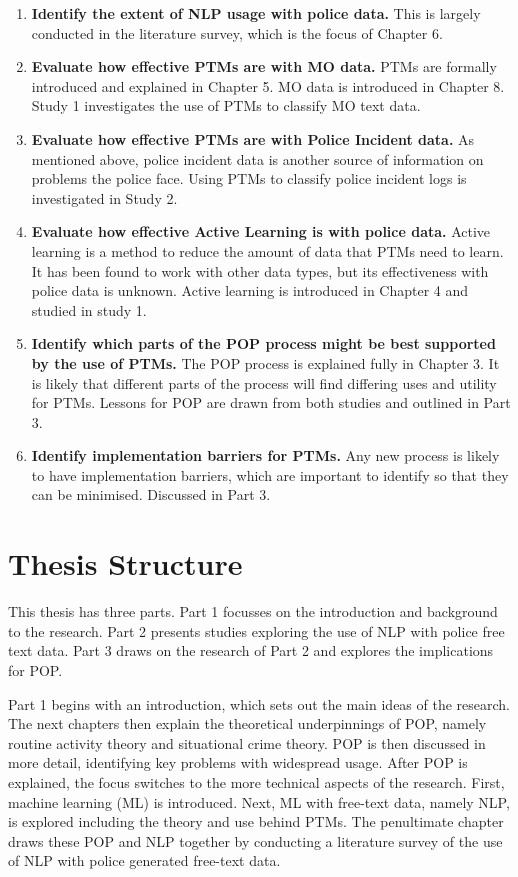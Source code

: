 \begin{enumerate}
\item {\bf Identify the extent of NLP usage with police data.} This is largely conducted in the literature survey, which is the focus of Chapter 6.

\item {\bf Evaluate how effective PTMs are with MO data.} PTMs are formally introduced and explained in Chapter 5. MO data is introduced in Chapter 8. Study 1 investigates the use of PTMs to classify MO text data.

\item {\bf Evaluate how effective PTMs are with Police Incident data.} As mentioned above, police incident data is another source of information on problems the police face. Using PTMs to classify police incident logs is investigated in Study 2.

\item {\bf Evaluate how effective Active Learning is with police data.}  Active learning is a method to reduce the amount of data that PTMs need to learn. It has been found to work with other data types, but its effectiveness with police data is unknown. Active learning is introduced in Chapter 4 and studied in study 1.

\item {\bf Identify which parts of the POP process might be best supported by the use of PTMs.} The POP process is explained fully in Chapter 3. It is likely that different parts of the process will find differing uses and utility for PTMs. Lessons for POP are drawn from both studies and outlined in Part 3.

\item {\bf Identify implementation barriers for PTMs.} Any new process is likely to have implementation barriers, which are important to identify so that they can be minimised. Discussed in Part 3.
\end{enumerate}



\section{Thesis Structure} This thesis has three parts. Part 1 focusses on the introduction and background to the research. Part 2 presents studies exploring the use of NLP with police free text data. Part 3 draws on the research of Part 2 and explores the implications for POP.

Part 1 begins with an introduction, which sets out the main ideas of the research. The next chapters then explain the theoretical underpinnings of POP, namely routine activity theory and situational crime theory. POP is then discussed in more detail, identifying key problems with widespread usage. After POP is explained, the focus switches to the more technical aspects of the research. First, machine learning (ML) is introduced. Next, ML with free-text data, namely NLP, is explored including the theory and use behind PTMs. The penultimate chapter draws these POP and NLP together by conducting a literature survey of the use of NLP with police generated free-text data.


